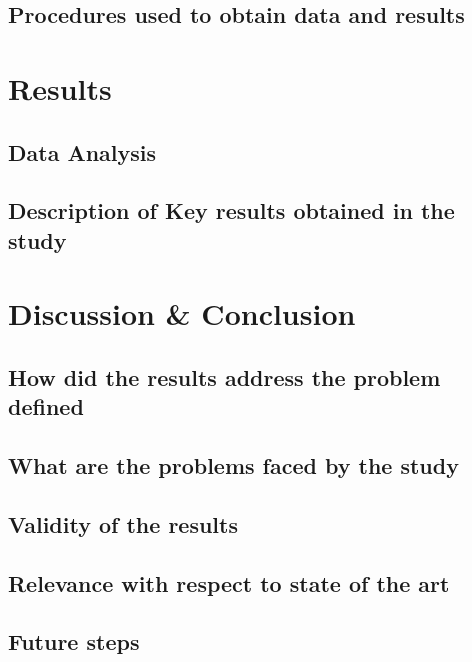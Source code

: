 \documentclass[12pt, a4paper,twoside]{tesi_upf}
\begin{document}
\section{Procedures used to obtain data and results}

\chapter{Results}

\section{Data Analysis}

\section{Description of Key results obtained in the study}

\chapter{Discussion \& Conclusion}

\section{How did the results address the problem defined}

\section{What are the problems faced by the study}

\section{Validity of the results}

\section{Relevance with respect to state of the art}

\section{Future steps}



\backmatter
\printindex
\end{document}
